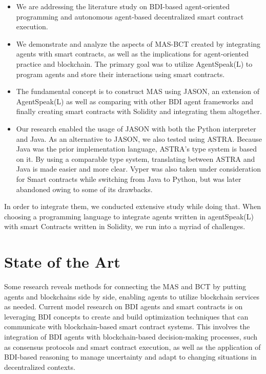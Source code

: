 \begin{itemize}
    \item We are addressing the literature study on \ac{BDI}-based agent-oriented programming and autonomous agent-based decentralized smart contract execution.

    \item We demonstrate and analyze the aspects of \ac{MAS}-\ac{BCT} created by integrating agents with smart contracts, as well as the implications for agent-oriented practice and blockchain. The primary goal was to utilize AgentSpeak(L) to program agents and store their interactions using smart contracts.
    
\vspace{.5cm}

    \item  The fundamental concept is to construct \ac{MAS} using JASON, an extension of AgentSpeak(L) as well as comparing with other \ac{BDI} agent frameworks and finally creating smart contracts with Solidity and integrating them altogether.
    
\vspace{.5cm}

    \item Our research enabled the usage of JASON with both the Python interpreter and Java. As an alternative to JASON, we also tested using \ac{ASTRA}. Because Java was the prior implementation language, \ac{ASTRA}'s type system is based on it. By using a comparable type system, translating between \ac{ASTRA} and Java is made easier and more clear. Vyper was also taken under consideration for Smart contracts while switching from Java to Python, but was later abandoned owing to some of its drawbacks.
    
\vspace{.5cm}

\end{itemize}

In order to integrate them, we conducted extensive study while doing that. When choosing a programming language to integrate agents written in agentSpeak(L) with smart Contracts written in Solidity, we run into a myriad of challenges.

\section{State of the Art}

Some research reveals methods for connecting the \ac{MAS} and \ac{BCT} by putting agents and blockchains side by side, enabling agents to utilize blockchain services as needed. Current model research on \ac{BDI} agents and smart contracts is on leveraging \ac{BDI} concepts to create and build optimization techniques that can communicate with blockchain-based smart contract systems. This involves the integration of \ac{BDI} agents with blockchain-based decision-making processes, such as consensus protocols and smart contract execution, as well as the application of \ac{BDI}-based reasoning to manage uncertainty and adapt to changing situations in decentralized contexts.


